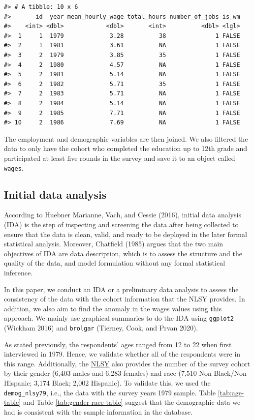 \documentclass[12pt]{article}
\begin{document}
\begin{verbatim}
#> # A tibble: 10 x 6
#>       id  year mean_hourly_wage total_hours number_of_jobs is_wm
#>    <int> <dbl>            <dbl>       <int>          <dbl> <lgl>
#>  1     1  1979             3.28          38              1 FALSE
#>  2     1  1981             3.61          NA              1 FALSE
#>  3     2  1979             3.85          35              1 FALSE
#>  4     2  1980             4.57          NA              1 FALSE
#>  5     2  1981             5.14          NA              1 FALSE
#>  6     2  1982             5.71          35              1 FALSE
#>  7     2  1983             5.71          NA              1 FALSE
#>  8     2  1984             5.14          NA              1 FALSE
#>  9     2  1985             7.71          NA              1 FALSE
#> 10     2  1986             7.69          NA              1 FALSE
\end{verbatim}

The employment and demographic variables are then joined. We also filtered the data to only have the cohort who completed the education up to 12th grade and participated at least five rounds in the survey and save it to an object called \texttt{wages}.

\hypertarget{ida}{%
\subsection{Initial data analysis}\label{ida}}

According to Huebner Marianne, Vach, and Cessie (2016), initial data analysis (IDA) is the step of inspecting and screening the data after being collected to ensure that the data is clean, valid, and ready to be deployed in the later formal statistical analysis. Moreover, Chatfield (1985) argues that the two main objectives of IDA are data description, which is to assess the structure and the quality of the data, and model formulation without any formal statistical inference.

In this paper, we conduct an IDA or a preliminary data analysis to assess the consistency of the data with the cohort information that the NLSY provides. In addition, we also aim to find the anomaly in the wages values using this approach. We mainly use graphical summaries to do the IDA using \texttt{ggplot2} (Wickham 2016) and \texttt{brolgar} (Tierney, Cook, and Prvan 2020).

As stated previously, the respondents' ages ranged from 12 to 22 when first interviewed in 1979. Hence, we validate whether all of the respondents were in this range. Additionally, the \href{https://www.nlsinfo.org/content/cohorts/nlsy79/intro-to-the-sample/nlsy79-sample-introduction}{NLSY} also provides the number of the survey cohort by their gender (6,403 males and 6,283 females) and race (7,510 Non-Black/Non-Hispanic; 3,174 Black; 2,002 Hispanic). To validate this, we used the \texttt{demog\_nlsy79}, i.e., the data with the survey years 1979 sample. Table \ref{tab:age-table} and Table \ref{tab:gender-race-table} suggest that the demographic data we had is consistent with the sample information in the database.
\end{document}
